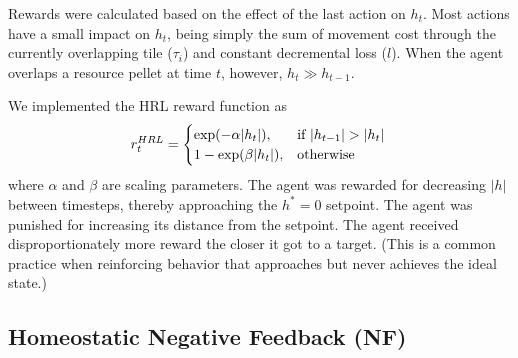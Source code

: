 \documentclass[12pt,fleqn]{article}
\begin{document}
Rewards were calculated based on the effect of the last action on \(h_t\). Most actions have a small impact on \(h_t\), being simply the sum of movement cost through the currently overlapping tile (\(\tau_i
\)) and constant decremental loss (\(l\)). When the agent overlaps a resource pellet at time \(t\), however, \(h_{t} \gg h_{t-1}\).

We implemented the HRL reward function as
\begin{equation*}
  r^{HRL}_t =
  \begin{cases}
    \exp(-\alpha|h_t|),   & \text{if } |h_{t-1}| > |h_t| \\
    1 - \exp(\beta|h_t|), & \text{otherwise}             \\
  \end{cases} \\
\end{equation*}
where \(\alpha\) and \(\beta\) are scaling parameters. The agent was rewarded for decreasing \(|h|\) between timesteps, thereby approaching the \(h^*=0\) setpoint. The agent was punished for increasing its distance from the setpoint. The agent received disproportionately more reward the closer it got to a target. (This is a common practice when reinforcing behavior that approaches but never achieves the ideal state.)

\subsection{Homeostatic Negative Feedback (NF)}
\end{document}
